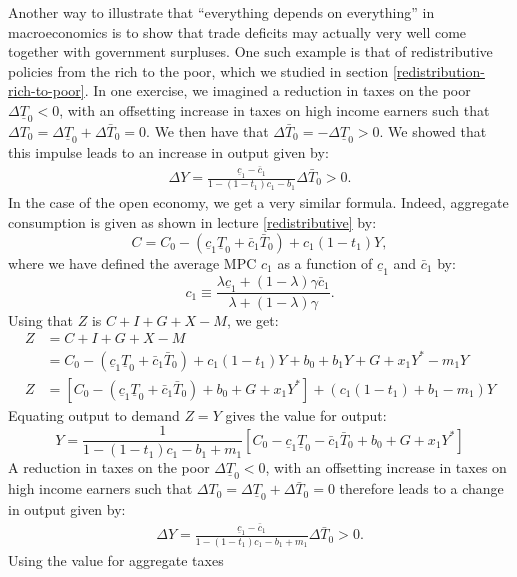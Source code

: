 \documentclass[]{book}
\begin{document}
Another way to illustrate that ``everything depends on everything'' in
macroeconomics is to show that trade deficits may actually very well
come together with government surpluses. One such example is that of
redistributive policies from the rich to the poor, which we studied in
section \ref{redistribution-rich-to-poor}. In one exercise, we imagined
a reduction in taxes on the poor \(\Delta\underline{T}_{0}<0\), with an
offsetting increase in taxes on high income earners such that
\(\Delta T_0 = \Delta\underline{T}_{0}+\Delta\bar{T}_{0}=0\). We then
have that \(\Delta\bar{T}_{0}=-\Delta\underline{T}_{0}>0\). We showed
that this impulse leads to an increase in output given by: \[
\begin{aligned}
\Delta Y=\frac{\underline{c}_{1}-\bar{c}_{1}}{1-\left(1-t_{1}\right)c_{1}-b_{1}}\Delta\bar{T}_{0}>0.
\end{aligned}
\] In the case of the open economy, we get a very similar formula.
Indeed, aggregate consumption is given as shown in lecture
\ref{redistributive} by:
\[C=C_0 -\left(\underline{c}_{1}\underline{T}_0+\bar{c}_{1}\bar{T}_0\right)+c_1 (1-t_1) Y,\]
where we have defined the average MPC \(c_1\) as a function of
\(\underline{c}_1\) and \(\bar{c}_1\) by:
\[c_{1}\equiv\frac{\lambda\underline{c}_{1}+\left(1-\lambda\right)\gamma\bar{c}_{1}}{\lambda+(1-\lambda)\gamma}.\]
Using that \(Z\) is \(C+I+G+X-M\), we get: \[
\begin{aligned}
Z   &=C+I+G+X-M\\
    &=C_0 -\left(\underline{c}_{1}\underline{T}_0+\bar{c}_{1}\bar{T}_0\right)+c_1 (1-t_1) Y + b_{0}+b_{1}Y+G + x_1 Y^{*} - m_1 Y\\
Z   &=\left[C_0 -\left(\underline{c}_{1}\underline{T}_0+\bar{c}_{1}\bar{T}_0\right)+ b_{0} + G + x_1 Y^{*} \right]+ \left(c_1(1-t_1) + b_1-m_1\right) Y 
\end{aligned}
\] Equating output to demand \(Z = Y\) gives the value for output:
\[Y=\frac{1}{1-\left(1-t_{1}\right)c_{1}-b_{1}+m_1}\left[C_0-\underline{c}_{1}\underline{T}_{0}-\bar{c}_{1}\bar{T}_{0}+b_{0}+G + x_1 Y^{*}\right]\]
A reduction in taxes on the poor \(\Delta\underline{T}_{0}<0\), with an
offsetting increase in taxes on high income earners such that
\(\Delta T_0 = \Delta\underline{T}_{0}+\Delta\bar{T}_{0}=0\) therefore
leads to a change in output given by: \[
\begin{aligned}
\Delta Y=\frac{\underline{c}_{1}-\bar{c}_{1}}{1-\left(1-t_{1}\right)c_{1}-b_{1}+m_1}\Delta\bar{T}_{0}>0.
\end{aligned}
\] Using the value for aggregate taxes
\end{document}
